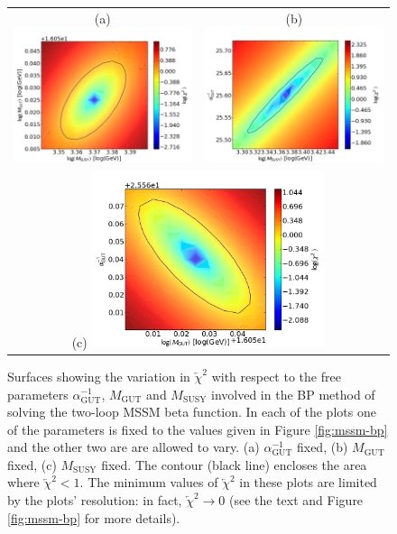 \documentclass[12pt,a4paper,oneside]{article}
\begin{document}
\begin{figure}[t]
\begin{center}
\begin{tabular}{cc}
(a) \includegraphics[width=6.85cm]{figs/mssm-contour-fix-ainv.png} &
(b) \includegraphics[width=6.85cm]{figs/mssm-contour-fix-mgut.png} \\
\multicolumn{2}{c}{(c) \includegraphics[width=6.85cm]{figs/mssm-contour-fix-msusy.png}} \\
\end{tabular}

\caption[]{Surfaces showing the variation in $\overleftarrow{\chi}^2$ with respect to the free parameters $\alpha_\mathrm{GUT}^{-1}$, $M_\mathrm{GUT}$ and $M_\mathrm{SUSY}$ involved in the BP method of solving the two-loop MSSM beta function. In each of the plots one of the parameters is fixed to the values given in Figure \ref{fig:mssm-bp} and the other two are are allowed to vary. (a) $\alpha_\mathrm{GUT}^{-1}$ fixed, (b) $M_\mathrm{GUT}$ fixed, (c) $M_\mathrm{SUSY}$ fixed. The contour (black line) encloses the area where $\overleftarrow{\chi}^2 < 1$. The minimum values of $\overleftarrow{\chi}^2$ in these plots are limited by the plots' resolution: in fact, $\overleftarrow{\chi}^2 \rightarrow 0$ (see the text and Figure \ref{fig:mssm-bp} for more details). }
\label{fig:mssm-bp-chi2}
\end{center}
\end{figure}
\end{document}
